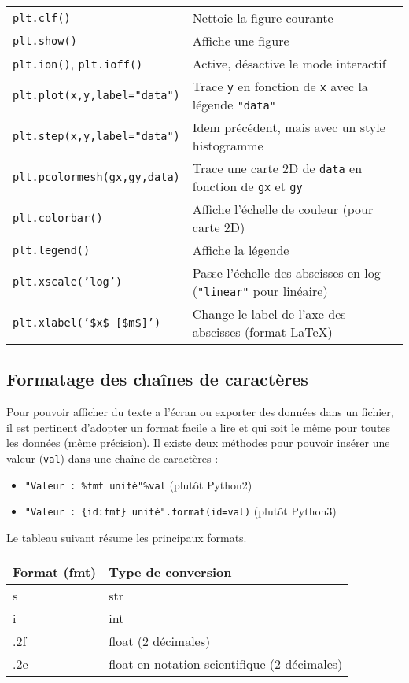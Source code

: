 \documentclass{article}
\begin{document}
\begin{tabular}{|l|l|}
    \texttt{plt.clf()}                          & Nettoie la figure courante\\
    \texttt{plt.show()}                         & Affiche une figure\\
    \texttt{plt.ion()}, \texttt{plt.ioff()}     & Active, désactive le mode interactif\\
    \texttt{plt.plot(x,y,label="data")}         & Trace \texttt{y} en fonction de \texttt{x} avec la légende \texttt{"data"}\\
    \texttt{plt.step(x,y,label="data")}         & Idem précédent, mais avec un style histogramme\\
    \texttt{plt.pcolormesh(gx,gy,data)}         & Trace une carte 2D de \texttt{data} en fonction de \texttt{gx} et \texttt{gy}\\
    \texttt{plt.colorbar()}                     & Affiche l'échelle de couleur (pour carte 2D)\\
    \texttt{plt.legend()}                       & Affiche la légende\\
    \texttt{plt.xscale('log')}                  & Passe l'échelle des abscisses en log (\texttt{"linear"} pour linéaire)\\
    \texttt{plt.xlabel('\$x\$ [\$m\$]')}        & Change le label de l'axe des abscisses (format LaTeX)\\
    \hline
\end{tabular}

\subsection*{Formatage des chaînes de caractères}
Pour pouvoir afficher du texte a l'écran ou exporter des données dans un fichier, il est pertinent d'adopter un format facile a lire et qui soit le même pour toutes les données (même précision). Il existe deux méthodes pour pouvoir insérer une valeur (\texttt{val}) dans une chaîne de caractères : 
\begin{itemize}
    \item \texttt{"Valeur : \%fmt unité"\%val} (plutôt Python2) 
    \item \texttt{"Valeur : \{id:fmt\} unité".format(id=val)} (plutôt Python3)
\end{itemize}

Le tableau suivant résume les principaux formats.

\begin{tabular}{|l|l|}
    \hline
    Format (fmt)    & Type de conversion\\
    \hline
    s               & str\\
    i               & int\\
    .2f             & float (2 décimales)\\
    .2e             & float en notation scientifique (2 décimales)\\
    \hline
\end{tabular}
\end{document}
